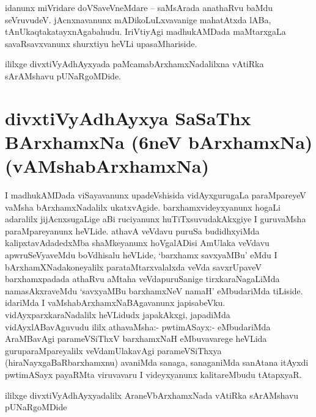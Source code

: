 \begin{artha}
idanunx miVridare doVSaveVneMdare -- saMsArada anathaRvu baMdu \break seVruvudeV. jAcnxnavanunx 
mADikoLuLxvavanige mahatAtxda lABa, tAnUkaqtakatayxnAga\-bahudu. IriVtiyAgi madhukAMDada 
maMtarxgaLa savaRsavxvanunx shurxtiyu heVLi upasaMhariside.
\end{artha}

\begin{center}
ililxge divxtiVyAdhAyxyada paMcamabArxhamxNadalilxna vAtiRka sArAMshavu pUNaRgoMDide.
\end{center}

\section*{divxtiVyAdhAyxya SaSaThx BArxhamxNa (6neV bArxhamxNa) (vAMshabArxhamxNa)}

\begin{center}


\end{center}

\begin{artha}
I madhukAMDada viSayavanunx upadeVshisida vidAyxgurugaLa paraMpareyeV \-vaMsha bArxhamxNadalilx ukatxvAgide. barxhamxvideyxyanunx hogaLi adaralilx jijAcnxsugaLige aBi ruciyanunx huTiTxsuvudakAkxgiye I guruvaMsha paraMpareyanunx heVLide. \-athavA veVdavu puruSa budidhxyiMda kalipxtavAdadedxMba shaMkeyanunx hoVgalADisi AmUlaka veVdavu apwruSeVyaveMdu boVdhisalu heVLide, `barxhamx savxyaMBu'  eMdu I bArxhamXNadakoneyalilx parataMtarxvalalxda veVda savxrUpaveV barxhamxpadada athaR\-vu aMtaha veVdapuruSanige tirxkaraNagaLiMda namasAkxraveMdu `savxyaMBu barxhamxNeV namaH' eMbudariMda tiLiside. idariMda I vaMshabArxhamxNaBAgavanunx japisabeVku. vidAyxparxkaraNadalilx heVLidudx japakAkxgi, japadiMda vidAyxlABavAguvudu ililx atha\-vaMsha:- pwtimASayx:- eMbudariMda AraMBavAgi parameVSiThxV barxhamxNaH eMbuva\-varege heVLida guruparaMpareyalilx veVdamUlakavAgi parameVSiThxya (hiraNayxgaBaR\-barxhamxnu) avaniMda sanaga, sanaganiMda sanAtana itAyxdi pwtimASayx payaRMta viruvavaru I videyxyanunx kalitareMbudu tAtapxyaR.
\end{artha}

\begin{center}
ililxge divxtiVyAdhAyxyadalilx AraneVbArxhamxNada vAtiRka sArAMshavu  pUNaRgoMDide
\end{center}

